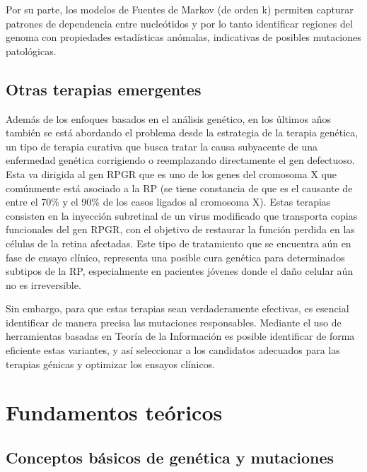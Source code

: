 \documentclass[11pt,spanish,listoffigures,listoftables]{tfgetsinf}
\begin{document}
Por su parte, los modelos de Fuentes de Markov (de orden k) permiten capturar patrones de dependencia entre nucleótidos y por lo tanto identificar regiones del genoma con propiedades estadísticas anómalas\cite{VOZ}, indicativas de posibles mutaciones patológicas.

\section{Otras terapias emergentes}

Además de los enfoques basados en el análisis genético, en los últimos años también se está abordando el problema desde la estrategia de la terapia genética, un tipo de terapia curativa que busca tratar la causa subyacente de una enfermedad genética corrigiendo o reemplazando directamente el gen defectuoso. Esta va dirigida al gen RPGR que es uno de los genes del cromosoma X que comúnmente está asociado a la RP (se tiene constancia de que es el causante de entre el 70\% y el 90\% de los casos ligados al cromosoma X)\cite{WAN}. Estas terapias consisten en la inyección subretinal de un virus modificado que transporta copias funcionales del gen RPGR, con el objetivo de restaurar la función perdida en las células de la retina afectadas\cite{ZON}. Este tipo de tratamiento que se encuentra aún en fase de ensayo clínico, representa una posible cura genética para determinados subtipos de la RP, especialmente en pacientes jóvenes donde el daño celular aún no es irreversible.

Sin embargo, para que estas terapias sean verdaderamente efectivas, es esencial identificar de manera precisa las mutaciones responsables. Mediante el uso de herramientas basadas en Teoría de la Información es posible identificar de forma eficiente estas variantes, y así seleccionar a los candidatos adecuados para las terapias génicas y optimizar los ensayos clínicos.



\chapter{Fundamentos teóricos}

\section{Conceptos básicos de genética y mutaciones}
\end{document}
